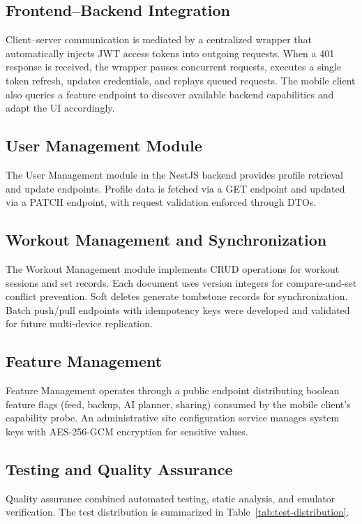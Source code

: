 \subsection{Frontend--Backend Integration}
Client--server communication is mediated by a centralized wrapper that automatically injects JWT access tokens into outgoing requests. When a 401 response is received, the wrapper pauses concurrent requests, executes a single token refresh, updates credentials, and replays queued requests. The mobile client also queries a feature endpoint to discover available backend capabilities and adapt the UI accordingly.

\subsection{User Management Module}
The User Management module in the NestJS backend provides profile retrieval and update endpoints. Profile data is fetched via a GET endpoint and updated via a PATCH endpoint, with request validation enforced through DTOs.

\subsection{Workout Management and Synchronization}
The Workout Management module implements CRUD operations for workout sessions and set records. Each document uses version integers for compare-and-set conflict prevention. Soft deletes generate tombstone records for synchronization. Batch push/pull endpoints with idempotency keys were developed and validated for future multi-device replication.

\subsection{Feature Management}
Feature Management operates through a public endpoint distributing boolean feature flags (feed, backup, AI planner, sharing) consumed by the mobile client's capability probe. An administrative site configuration service manages system keys with AES-256-GCM encryption for sensitive values.

\subsection{Testing and Quality Assurance}
Quality assurance combined automated testing, static analysis, and emulator verification. The test distribution is summarized in Table~\ref{tab:test-distribution}.

